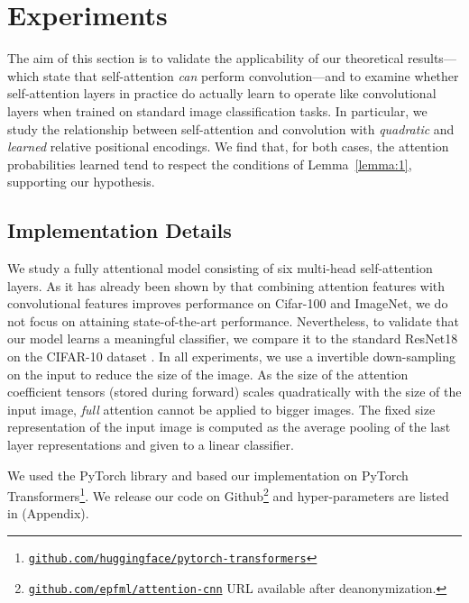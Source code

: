 \documentclass{article} \usepackage{iclr2020_conference,times}
\newcommand{\githuburl}{\href{https://github.com/epfml/attention-cnn}{\tt github.com/epfml/attention-cnn}}
\begin{document}
\section{Experiments}
\label{sec:experiments}

The aim of this section is to validate the applicability of our theoretical results---which state that self-attention \emph{can} perform convolution---and to examine whether self-attention layers in practice do actually learn to operate like convolutional layers when trained on standard image classification tasks.
In particular, we study the relationship between self-attention and convolution with \textit{quadratic} and \textit{learned} relative positional encodings. We find that, for both cases, the attention probabilities learned tend to respect the conditions of Lemma~\ref{lemma:1}, supporting our hypothesis.




\subsection{Implementation Details}
\label{ssec:experiment_setup}

We study a fully attentional model consisting of six multi-head self-attention layers.
As it has already been shown by \cite{belloAttentionAugmentedConvolutional2019} that
combining attention features with convolutional features improves performance on Cifar-100 and ImageNet, we do not focus on attaining state-of-the-art performance. Nevertheless, to validate that our model learns a meaningful classifier, we compare it to the standard ResNet18 \citep{He2015resnet} on the CIFAR-10 dataset \citep{cifar10}.
In all experiments, we use a  invertible down-sampling \citep{jacobsen2018irevnet} on the input to reduce the size of the image. As the size of the attention coefficient tensors (stored during forward) scales quadratically with the size of the input image, \emph{full} attention cannot be applied to bigger images.  The fixed size representation of the input image is computed as the average pooling of the last layer representations and given to a linear classifier.

We used the PyTorch library \citep{paszke2017automatic} and based our implementation on PyTorch Transformers\footnote{\href{https://github.com/huggingface/pytorch-transformers}{\tt github.com/huggingface/pytorch-transformers}}.
We release our code on Github\footnote{\ificlrfinal \githuburl{} \else URL available after deanonymization.\fi} and hyper-parameters are listed in  (Appendix).
\end{document}
